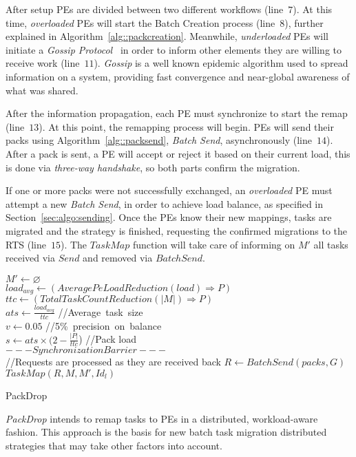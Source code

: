 After setup PEs are divided between two different workflows (line~$7$).
At this time, \textit{overloaded} PEs will start the Batch Creation process (line~$8$), further explained in Algorithm~\ref{alg::packcreation}.
Meanwhile, \textit{underloaded} PEs will initiate a \textit{Gossip Protocol}~\cite{gossip} in order to inform other elements they are willing to receive work (line~$11$).
\textit{Gossip} is a well known epidemic algorithm used to spread information on a system, providing fast convergence and near-global awareness of what was shared.

After the information propagation, each PE must synchronize to start the remap (line~$13$). 
At this point, the remapping process will begin.
PEs will send their packs using Algorithm~\ref{alg::packsend}, \textit{Batch Send}, asynchronously (line~$14$).
After a pack is sent, a PE will accept or reject it based on their current load, this is done via \textit{three-way handshake}, so both parts confirm the migration.

If one or more packs were not successfully exchanged, an \textit{overloaded} PE must attempt a new \textit{Batch Send}, in order to achieve load balance, as specified in Section~\ref{sec:algo:sending}.
Once the PEs know their new mappings, tasks are migrated and the strategy is finished, requesting the confirmed migrations to the RTS (line~$15$). 
The $TaskMap$ function will take care of informing on $M'$ all tasks received via $Send$ and removed via $BatchSend$.

\begin{algorithm}
	\DontPrintSemicolon
    $  M' \gets \varnothing$\\
    $load_{avg} \gets (AveragePeLoadReduction(load)\Rightarrow  P)$ \\
    $ttc \gets (TotalTaskCountReduction(|M|)\Rightarrow  P)$\\
    $ats\gets \frac{load_{avg}}{ttc}$ \quad\qquad //Average~task~size\\
    $v \gets 0.05$ \qquad //5\%~precision~on~balance\\
    $s \gets ats\times (2-\frac{|  P|}{ttc}$) \qquad\qquad //Pack load\\
    $---Synchronization Barrier---$\\
    //Requests are processed as they are received back
    $R \gets BatchSend(packs, G)$\\
    $TaskMap(R,M, M',Id_{l})$
    \caption{PackDrop}
    \label{alg::packdrop}    
\end{algorithm}

\textit{PackDrop} intends to remap tasks to PEs in a distributed, workload-aware fashion.
This approach is the basis for new batch task migration distributed strategies that may take other factors into account.

